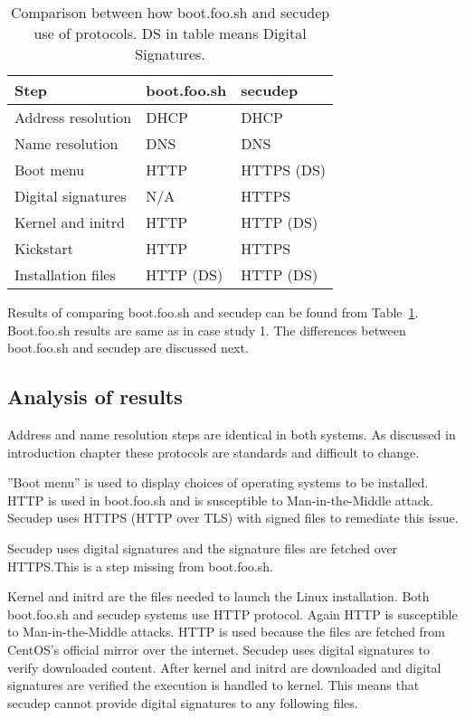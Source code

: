 \begin{table}[!ht]
  \def\arraystretch{1.1}%
  \begin{center}
    \caption{Comparison between how boot.foo.sh and secudep use of
      protocols. DS in table means Digital
      Signatures.\label{tab:comparison_table}}
    \begin{tabular}{| l | l | l |}
      \hline
      Step               & boot.foo.sh   & secudep    \\
      \hline
      Address resolution & DHCP          & DHCP       \\
      Name resolution    & DNS           & DNS        \\
      Boot menu          & HTTP          & HTTPS (DS) \\
      Digital signatures & N/A           & HTTPS      \\
      Kernel and initrd  & HTTP          & HTTP (DS)  \\
      Kickstart          & HTTP          & HTTPS      \\
      Installation files & HTTP (DS)     & HTTP (DS)  \\
      \hline
    \end{tabular}
  \end{center}
\end{table}

Results of comparing boot.foo.sh and secudep can be found from
Table~\ref{tab:comparison_table}. Boot.foo.sh results are same as in
case study 1. The differences between boot.foo.sh and secudep are
discussed next.


\subsection{Analysis of results}

Address and name resolution steps are identical in both systems. As
discussed in introduction chapter these protocols are standards and
difficult to change.

''Boot menu'' is used to display choices of operating systems to be
installed. HTTP is used in boot.foo.sh and is susceptible to
Man-in-the-Middle attack. Secudep uses HTTPS (HTTP over TLS) with
signed files to remediate this issue.

Secudep uses digital signatures and the signature files are fetched
over HTTPS.\@ This is a step missing from boot.foo.sh.

Kernel and initrd are the files needed to launch the Linux
installation. Both boot.foo.sh and secudep systems use HTTP
protocol. Again HTTP is susceptible to Man-in-the-Middle attacks. HTTP
is used because the files are fetched from CentOS's official mirror
over the internet. Secudep uses digital signatures to verify
downloaded content. After kernel and initrd are downloaded and digital
signatures are verified the execution is handled to kernel. This means
that secudep cannot provide digital signatures to any following files.


